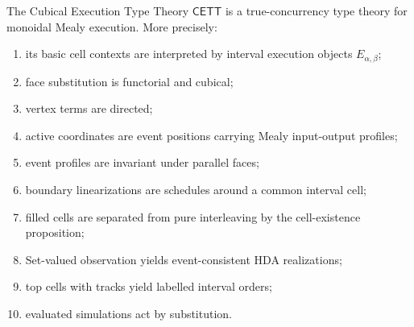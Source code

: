 \begin{theorem}
\label{thm:cmett-true-concurrency-adequacy-cett}
    The Cubical Execution Type Theory \(\mathsf{CETT}\) is a
    true-concurrency type theory for monoidal Mealy execution. More
    precisely:
    \begin{enumerate}
        \item its basic cell contexts are interpreted by interval execution
        objects \(E_{\alpha,\beta}\);
        \item face substitution is functorial and cubical;
        \item vertex terms are directed;
        \item active coordinates are event positions carrying Mealy
        input-output profiles;
        \item event profiles are invariant under parallel faces;
        \item boundary linearizations are schedules around a common interval
        cell;
        \item filled cells are separated from pure interleaving by the
        cell-existence proposition;
        \item Set-valued observation yields event-consistent HDA
        realizations;
        \item top cells with tracks yield labelled interval orders;
        \item evaluated simulations act by substitution.
    \end{enumerate}
\end{theorem}

